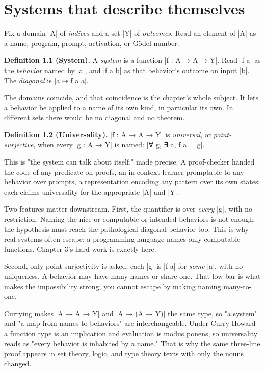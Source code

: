 \documentclass{memoir}
\begin{document}
\section{Systems that describe themselves}\label{Two--Schemas--of--Impossibility-005F-005F-005F--Machine--Checked--Limits--of--Trustworthy--Machine--Learning-005F-005F-005F--and--Why--They--Tighten--with--Capability----The--Diagonal----Systems--that--describe--themselves}

Fix a domain \LeanVerb|A| of \emph{indices} and a set \LeanVerb|Y| of \emph{outcomes}. Read an element of
\LeanVerb|A| as a name, program, prompt, activation, or Gödel number.

\textbf{Definition 1.1 (System).} A \emph{system} is a function \LeanVerb|f : A → A → Y|. Read \LeanVerb|f a|
as the \emph{behavior} named by \LeanVerb|a|, and \LeanVerb|f a b| as that behavior's outcome on input
\LeanVerb|b|. The \emph{diagonal} is \LeanVerb|a ↦ f a a|.

The domains coincide, and that coincidence is the chapter's whole subject. It
lets a behavior be applied to a name of its own kind, in particular its own. In
different sets there would be no diagonal and no theorem.

\textbf{Definition 1.2 (Universality).} \LeanVerb|f : A → A → Y| is \emph{universal}, or
\emph{point-surjective}, when every \LeanVerb|g : A → Y| is named: \LeanVerb|∀ g, ∃ a, f a = g|.

This is "the system can talk about itself," made precise. A proof-checker handed
the code of any predicate on proofs, an in-context learner promptable to any
behavior over prompts, a representation encoding any pattern over its own
states: each claims universality for the appropriate \LeanVerb|A| and \LeanVerb|Y|.

Two features matter downstream. First, the quantifier is over \emph{every} \LeanVerb|g|, with
no restriction. Naming the nice or computable or intended behaviors is not
enough; the hypothesis must reach the pathological diagonal behavior too. This
is why real systems often escape: a programming language names only computable
functions. Chapter 3's hard work is exactly here.

Second, only point-surjectivity is asked: each \LeanVerb|g| is \LeanVerb|f a| for \emph{some} \LeanVerb|a|, with
no uniqueness. A behavior may have many names or share one. That low bar is what
makes the impossibility strong; you cannot escape by making naming many-to-one.

Currying makes \LeanVerb|A → A → Y| and \LeanVerb|A → (A → Y)| the same type, so "a system" and "a
map from names to behaviors" are interchangeable. Under Curry-Howard a function
type is an implication and evaluation is modus ponens, so universality reads as
"every behavior is inhabited by a name." That is why the same three-line proof
appears in set theory, logic, and type theory texts with only the nouns changed.
\end{document}
